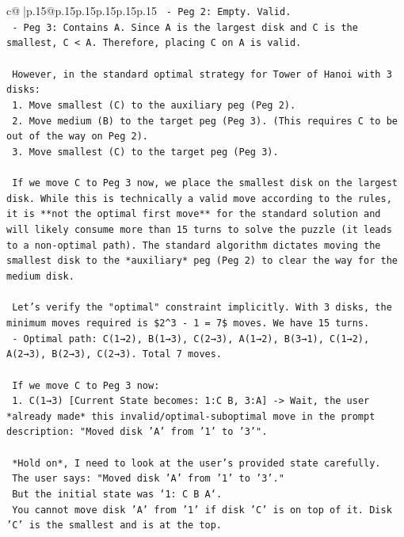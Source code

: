 \documentclass{article}
\begin{document}
{\begin{supertabular}{c@{$\;$}|p{.15\linewidth}@{}p{.15\linewidth}p{.15\linewidth}p{.15\linewidth}p{.15\linewidth}p{.15\linewidth}}
{{{\texttt{    {-} Peg 2: Empty. Valid.} \\
\texttt{    {-} Peg 3: Contains A. Since A is the largest disk and C is the smallest, C < A. Therefore, placing C on A is valid.} \\
\\ 
\texttt{  However, in the standard optimal strategy for Tower of Hanoi with 3 disks:} \\
\texttt{  1. Move smallest (C) to the auxiliary peg (Peg 2).} \\
\texttt{  2. Move medium (B) to the target peg (Peg 3). (This requires C to be out of the way on Peg 2).} \\
\texttt{  3. Move smallest (C) to the target peg (Peg 3).} \\
\\ 
\texttt{  If we move C to Peg 3 now, we place the smallest disk on the largest disk. While this is technically a valid move according to the rules, it is **not the optimal first move** for the standard solution and will likely consume more than 15 turns to solve the puzzle (it leads to a non{-}optimal path). The standard algorithm dictates moving the smallest disk to the *auxiliary* peg (Peg 2) to clear the way for the medium disk.} \\
\\ 
\texttt{  Let's verify the "optimal" constraint implicitly. With 3 disks, the minimum moves required is \$2\^{}3 {-} 1 = 7\$ moves. We have 15 turns.} \\
\texttt{  {-} Optimal path: C(1→2), B(1→3), C(2→3), A(1→2), B(3→1), C(1→2), A(2→3), B(2→3), C(2→3). Total 7 moves.} \\
\\ 
\texttt{  If we move C to Peg 3 now:} \\
\texttt{  1. C(1→3) {[}Current State becomes: 1:C B, 3:A{]} {-}> Wait, the user *already made* this invalid/optimal{-}suboptimal move in the prompt description: "Moved disk 'A' from '1' to '3'".} \\
\\ 
\texttt{  *Hold on*, I need to look at the user's provided state carefully.} \\
\texttt{  The user says: "Moved disk 'A' from '1' to '3'."} \\
\texttt{  But the initial state was `1: C B A`.} \\
\texttt{  You cannot move disk 'A' from '1' if disk 'C' is on top of it. Disk 'C' is the smallest and is at the top.} \\
\\ 
}}}
\end{supertabular}}
\end{document}
